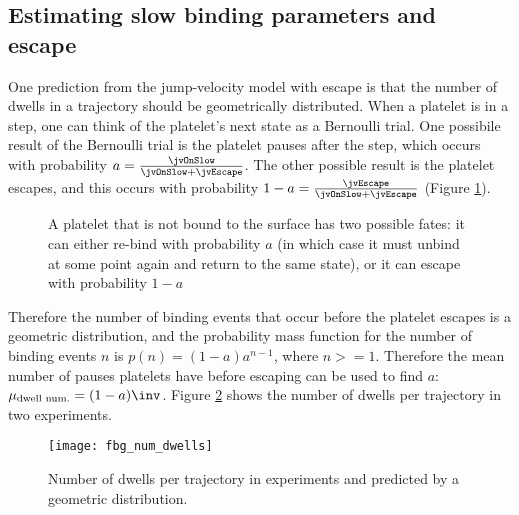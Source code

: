 \subsection{Estimating slow binding parameters and escape}
\label{sec:estim-slow-bind}

One prediction from the jump-velocity model with escape is that the
number of dwells in a trajectory should be geometrically
distributed. When a platelet is in a step, one can think of the
platelet's next state as a Bernoulli trial. One possibile result of
the Bernoulli trial is the platelet pauses after the step, which
occurs with probability $a = \frac{\jvOnSlow}{\jvOnSlow +
  \jvEscape}$. The other possible result is the platelet escapes, and
this occurs with probability
$1 - a = \frac{\jvEscape}{\jvOnSlow + \jvEscape}$ (Figure
\ref{fig:unbd-plt-fates}).

\begin{figure}
  \centering
  \caption[Possible fates of an unbound platelet]{A platelet that is
    not bound to the surface has two possible fates: it can either
    re-bind with probability $a$ (in which case it must unbind at some
    point again and return to the same state), or it can escape with
    probability $1 - a$}
  \label{fig:unbd-plt-fates}
\end{figure}

Therefore the number of binding events that occur before the platelet
escapes is a geometric distribution, and the probability mass function
for the number of binding events $n$ is $p(n) = (1 - a) a^{n - 1}$,
where $n >= 1$. Therefore the mean number of pauses platelets have
before escaping can be used to find $a$:
$\mu_\textnormal{dwell num.}  = (1 - a)\inv$. Figure \ref{fig:ndwells}
shows the number of dwells per trajectory in two experiments.

\begin{figure}
  \centering
  \texttt{[image: fbg\_num\_dwells]}
  \caption{Number of dwells per trajectory in experiments and
    predicted by a geometric distribution.}
  \label{fig:ndwells}
\end{figure}


